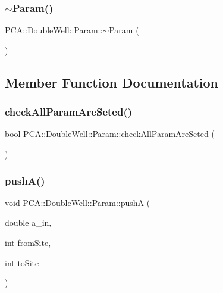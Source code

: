 \subsubsection{\texorpdfstring{$\sim$\+Param()}{~Param()}}
{\footnotesize\ttfamily P\+C\+A\+::\+Double\+Well\+::\+Param\+::$\sim$\+Param (\begin{DoxyParamCaption}{ }\end{DoxyParamCaption})}



\subsection{Member Function Documentation}
\hypertarget{class_p_c_a_1_1_double_well_1_1_param_a8dcbc0e63b75467a3797f2478be2eb28}{}\label{class_p_c_a_1_1_double_well_1_1_param_a8dcbc0e63b75467a3797f2478be2eb28} 
\subsubsection{\texorpdfstring{check\+All\+Param\+Are\+Seted()}{checkAllParamAreSeted()}}
{\footnotesize\ttfamily bool P\+C\+A\+::\+Double\+Well\+::\+Param\+::check\+All\+Param\+Are\+Seted (\begin{DoxyParamCaption}{ }\end{DoxyParamCaption})}

\hypertarget{class_p_c_a_1_1_double_well_1_1_param_acf6d26642f3b90c4e9db9e3ef7db81f7}{}\label{class_p_c_a_1_1_double_well_1_1_param_acf6d26642f3b90c4e9db9e3ef7db81f7} 
\subsubsection{\texorpdfstring{push\+A()}{pushA()}}
{\footnotesize\ttfamily void P\+C\+A\+::\+Double\+Well\+::\+Param\+::pushA (\begin{DoxyParamCaption}\item[{double}]{a\+\_\+in,  }\item[{int}]{from\+Site,  }\item[{int}]{to\+Site }\end{DoxyParamCaption})}

